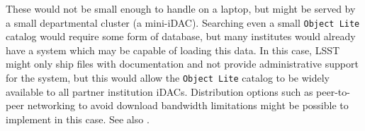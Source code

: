 These would not be small enough to handle on a laptop, but might be served by a small departmental cluster (a mini-iDAC). 
Searching even a small {\tt Object Lite} catalog would require some form of database, but many institutes would already have a system which may be capable of loading this data. 
In this case, LSST might only ship files with documentation and not provide administrative support for the system, but this would allow the {\tt Object Lite} catalog to be widely available to all partner institution iDACs. Distribution options such as peer-to-peer networking to avoid download bandwidth limitations might be possible to implement in this case. See also .

